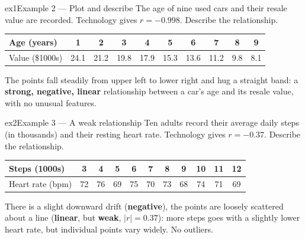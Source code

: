 \documentclass[11pt]{article}
\begin{document}
\begin{example}{ex1}{Example 2 --- Plot and describe}
The age of nine used cars and their resale value are recorded. Technology gives $r=-0.998$. Describe the relationship.\begin{center}\footnotesize\begin{tabular}{|l|*{9}{c|}}\hline Age (years) & 1 & 2 & 3 & 4 & 5 & 6 & 7 & 8 & 9 \\ \hline Value (\$1000s) & 24.1 & 21.2 & 19.8 & 17.9 & 15.3 & 13.6 & 11.2 & 9.8 & 8.1 \\ \hline\end{tabular}\end{center}\soln The points fall steadily from upper left to lower right and hug a straight band: a \textbf{strong, negative, linear} relationship between a car's age and its resale value, with no unusual features.
\end{example}

\begin{example}{ex2}{Example 3 --- A weak relationship}
Ten adults record their average daily steps (in thousands) and their resting heart rate. Technology gives $r=-0.37$. Describe the relationship.\begin{center}\footnotesize\begin{tabular}{|l|*{10}{c|}}\hline Steps (1000s) & 3 & 4 & 5 & 6 & 7 & 8 & 9 & 10 & 11 & 12 \\ \hline Heart rate (bpm) & 72 & 76 & 69 & 75 & 70 & 73 & 68 & 74 & 71 & 69 \\ \hline\end{tabular}\end{center}\soln There is a slight downward drift (\textbf{negative}), the points are loosely scattered about a line (\textbf{linear}, but \textbf{weak}, $|r|=0.37$): more steps goes with a slightly lower heart rate, but individual points vary widely. No outliers.
\end{example}
\end{document}
